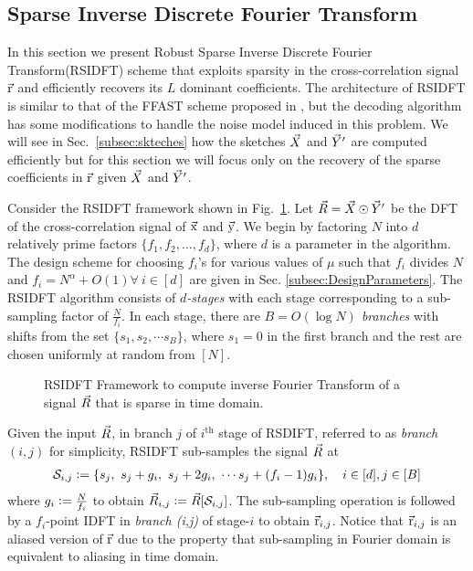 \subsection{Sparse Inverse Discrete Fourier Transform}
\label{subsec:RSIDFT}	
 In this section we present Robust Sparse Inverse Discrete Fourier Transform(RSIDFT) scheme that exploits sparsity in the cross-correlation signal $\vec{\mathrm{r}}$ and efficiently recovers its $L$ dominant coefficients. The architecture of RSIDFT is similar to that of the FFAST scheme proposed in \cite{pawar2014robust}, but the decoding algorithm has some modifications to handle the noise model induced in this problem. We will see in Sec.~\ref{subsec:skteches} how the sketches $\vec{X}$ and $\vec{Y}'$ are computed efficiently but for this section we will focus only on the recovery of the sparse coefficients in $\vec{\mathrm{r}}$ given $\vec{X}$ and $\vec{Y}'$.
	  	
Consider the RSIDFT framework shown in Fig.~\ref{fig:rsidft}. Let $ \vec{R} =\vec{X} \odot \vec{Y}'$ be the DFT of the cross-correlation signal of $\vec{\mathrm{x}}$ and $\vec{\mathrm{y}}$. We begin by factoring $N$ into $d$ relatively prime factors $\{f_1,f_2,\ldots,f_d\}$, where $d$ is a parameter in the algorithm. The design scheme for choosing $f_i$'s for various values of $\mu$ such that $f_i$ divides $N$ and $f_i=N^{\alpha}+O(1) \forall ~i\in[d]$ are given in Sec. \ref{subsec:DesignParameters}. The RSIDFT algorithm consists of {\it $d$-stages} with each stage corresponding to a sub-sampling factor of $\frac{N}{f_i}$. In each stage, there are {\it $B= O(\log N)$ branches} with shifts from the set $ \{s_1, s_2, \cdots s_B\} $, where $s_1 =0$ in the first branch and the rest are chosen uniformly at random from $[N]$.
	   	 	
\begin{figure}[h!]
	\begin{center}
	 	\resizebox{0.45\textwidth}{!}{}
	\end{center}	
\caption{ RSIDFT Framework to compute inverse Fourier Transform of a signal $\vec{R}$ that is sparse in time domain. }\label{fig:rsidft}
\end{figure}

	 Given the input $\vec{R}$, in branch $j$ of $i^{\text{th}}$ stage of RSDIFT, referred to as \textit{branch $(i,j)$} for simplicity, RSIDFT sub-samples the signal $\vec{R}$ at
\begin{align}
\label{Eqn:SamplingSets}
	 \mathcal{S}_{i,j} \mathrel{\mathop:}= \{s_j,\ s_j + g_i,\ s_j + 2g_i,\ \cdots s_j + (f_i-1) g_i\}, \quad i\in[d], j\in[B]
\end{align}
where $g_i\mathrel{\mathop:}= \frac{N}{f_i}$ to obtain $\vec{R}_{i,j}\mathrel{\mathop:}=\vec{R}[\mathcal{S}_{i,j}]$. The sub-sampling operation is followed by a $f_i$-point IDFT in \textit{branch (i,j)} of stage-$i$ to obtain $ \vec{\mathrm{r}}_{i,j}$. Notice that $ \vec{\mathrm{r}}_{i,j}$ is an aliased version of $\vec{\mathrm{r}}$ due to the property that sub-sampling in Fourier domain is equivalent to aliasing in time domain.

